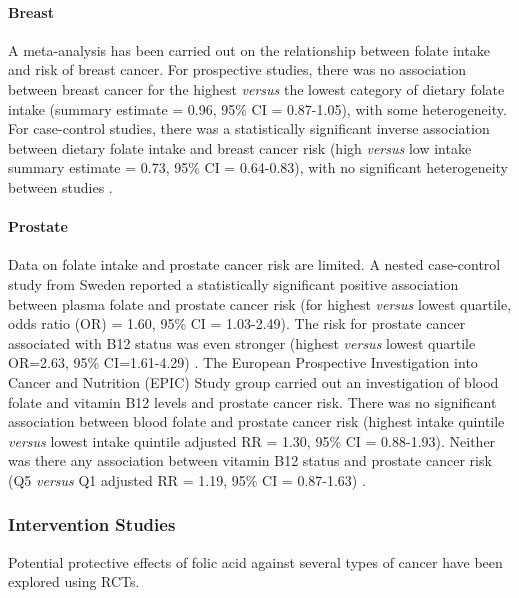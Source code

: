 \paragraph{Breast} %
A meta-analysis has been carried out on the relationship between folate intake and risk of breast cancer. For prospective studies, there was no association between breast cancer for the highest \emph{versus} the lowest category of dietary folate intake (summary estimate = 0.96, 95\% CI = 0.87-1.05), with some heterogeneity. For case-control studies, there was a statistically significant inverse association between dietary folate intake and breast cancer risk (high \emph{versus} low intake summary estimate = 0.73, 95\% CI = 0.64-0.83), with no significant heterogeneity between studies \cite{c235}. 
 
\paragraph{Prostate} %
Data on folate intake and prostate cancer risk are limited. A nested case-control study from Sweden reported a statistically significant positive association between plasma folate and prostate cancer risk (for highest \emph{versus} lowest quartile, odds ratio (OR) = 1.60, 95\% CI = 1.03-2.49). The risk for prostate cancer associated with B12 status was even stronger (highest \emph{versus} lowest quartile OR=2.63, 95\% CI=1.61-4.29) \cite{c236}. The European Prospective Investigation into Cancer and Nutrition (EPIC) Study group carried out an investigation of blood folate and vitamin B12 levels and prostate cancer risk. There was no significant association between blood folate and prostate cancer risk (highest intake quintile \emph{versus} lowest intake quintile adjusted RR = 1.30, 95\% CI = 0.88-1.93). Neither was there any association between vitamin B12 status and prostate cancer risk (Q5 \emph{versus} Q1 adjusted RR = 1.19, 95\% CI = 0.87-1.63) \cite{c237}. 
 
\subsubsection{Intervention Studies} %
\noindent Potential protective effects of folic acid against several types of cancer have been explored using RCTs. 
 
